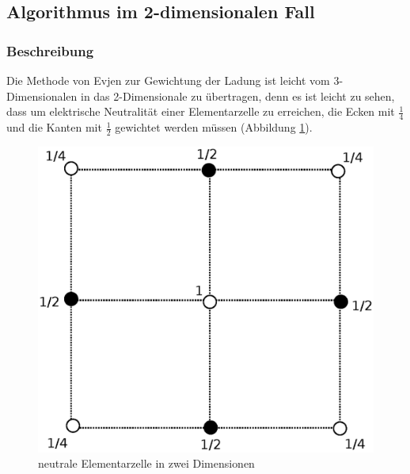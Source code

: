 \documentclass[10pt,a4paper]{article}
\begin{document}
\subsection{Algorithmus im 2-dimensionalen Fall}
\subsubsection{Beschreibung}
Die Methode von Evjen zur Gewichtung der Ladung ist leicht vom 3-Dimensionalen
in das 2-Dimensionale zu übertragen, denn es ist leicht zu sehen, dass um elektrische
Neutralität einer Elementarzelle zu erreichen, die Ecken mit $\frac{1}{4}$ und die Kanten mit
$\frac{1}{2}$ gewichtet werden müssen (Abbildung \ref{skalierungsgrafik2d}).

\begin{figure}[h]
	\centering
	\includegraphics[scale = 0.35]{./figures/quadrat.eps}
	\caption{neutrale Elementarzelle in zwei Dimensionen}
	\label{skalierungsgrafik2d}
\end{figure}
\end{document}
